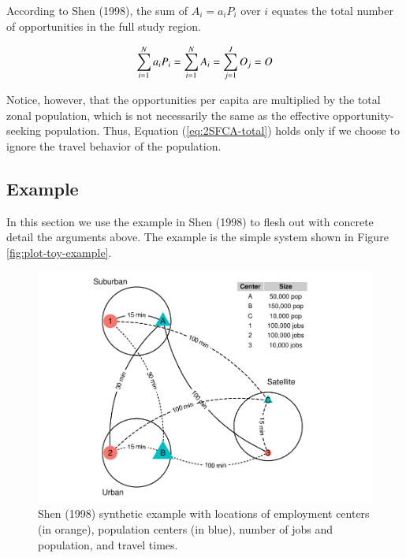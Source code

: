 \documentclass[]{elsarticle} %
\begin{document}
According to Shen (1998), the sum of \(A_i = a_i P_i\) over \(i\)
equates the total number of opportunities in the full study region.

\begin{equation}
\label{eq:2SFCA-total}
\sum_{i=1}^N a_{i} P_i = \sum_{i=1}^N A_i = \sum_{j=1}^JO_j=O\\
\end{equation}

Notice, however, that the opportunities per capita are multiplied by the
total zonal population, which is not necessarily the same as the
effective opportunity-seeking population. Thus, Equation
(\ref{eq:2SFCA-total}) holds only if we choose to ignore the travel
behavior of the population.

\hypertarget{example}{%
\subsection{Example}\label{example}}

In this section we use the example in Shen (1998) to flesh out with
concrete detail the arguments above. The example is the simple system
shown in Figure \ref{fig:plot-toy-example}.

\begin{figure}

{\centering \includegraphics[width=1\linewidth]{Spatial-Availability-Refreshed_files/figure-latex/create-figure-with-toy-example-1} 

}

\caption{\label{fig:plot-toy-example} Shen (1998) synthetic example with locations of employment centers (in orange), population centers (in blue), number of jobs and population, and travel times.}\label{fig:create-figure-with-toy-example}
\end{figure}
\end{document}
